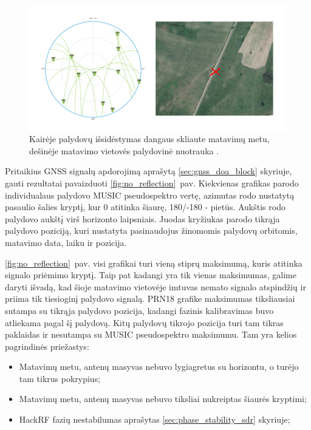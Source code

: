 \documentclass[main.tex]{subfiles}
\begin{document}
\begin{figure}[ht]
    \begin{centering}
    \includegraphics[scale=0.35]{drawings/open_sat_positions.drawio}
    \par\end{centering}
    \protect\caption{\label{fig:no_reflection_sat_pos}Kairėje palydovų išsidėstymas dangaus skliaute matavimų metu, dešinėje matavimo vietovės palydovinė nuotrauka \cite{google_maps}.}
\end{figure}

Pritaikius GNSS signalų apdorojimą aprašytą \ref{sec:gnss_doa_block} skyriuje, gauti
rezultatai pavaizduoti \ref{fig:no_reflection}~pav. Kiekvienas grafikas parodo
individualaus palydovo MUSIC pseudospektro vertę, azimutas rodo nustatytą
pasaulio šalies kryptį, kur 0 atitinka šiaurę, 180/-180 - pietūs. Aukštis rodo palydovo aukštį virš horizonto
laipsniais.
Juodas kryžiukas parodo tikrąja palydovo poziciją, kuri
nustatyta pasinaudojus žinomomis palydovų orbitomis, matavimo data, laiku ir pozicija.

\ref{fig:no_reflection}~pav. visi grafikai turi vieną stiprų maksimumą, kuris atitinka signalo priėmimo kryptį.
Taip pat kadangi yra tik vienas maksimumas, galime daryti išvadą, kad šioje matavimo vietovėje
imtuvas nemato signalo atspindžių ir priima tik tiesioginį palydovo signalą.
PRN18 grafike maksimumas tiksliausiai sutampa su tikrąja palydovo pozicija, kadangi
fazinis kalibravimas buvo atliekama pagal šį palydovą.
Kitų palydovų tikrojo pozicija turi tam tikras paklaidas ir nesutampa su MUSIC pseudospektro
maksimumu. Tam yra kelios pagrindinės priežastys:

\begin{itemize}
    \item Matavimų metu, antenų masyvas nebuvo lygiagretus su horizontu, o turėjo tam tikrus pokrypius;
    \item Matavimų metu, antenų masyvas nebuvo tiksliai nukreiptas šiaurės kryptimi;
    \item HackRF fazių nestabilumas aprašytas \ref{sec:phase_stability_sdr} skyriuje;
\end{itemize}
\end{document}
